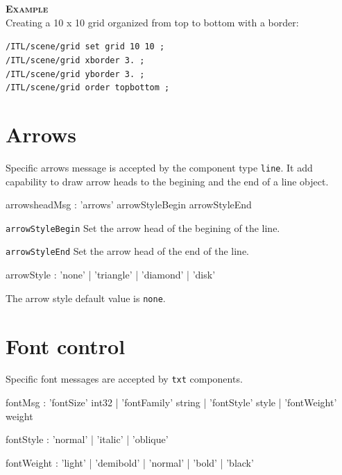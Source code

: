 \documentclass[a4paper,twoside]{report}
\newcommand{\sublevel}[1]	{\section{#1}}
\newcommand{\OSC}[1]		{\texttt{#1}}
\newcommand{\example}		{\textbf{\hspace{-1.5cm}\textbf{\textsc{Example }}}}
\let\olditemize\itemize
\let\oldenditemize\enditemize
\renewenvironment{itemize} 	{\olditemize \setlength{\itemsep}{1mm}}{\oldenditemize}
\newcommand{\sample}	[1]			{\vspace{-2mm}\begin{center}\colorbox{mygrey}{
								\begin{minipage}[t]{0.9\columnwidth} 
								{\small \texttt{#1}}
								\end{minipage}}\end{center}}
\begin{document}
\example \\
Creating a 10 x 10 grid organized from top to bottom with a border:
\sample{/ITL/scene/grid set grid 10 10 ;\\
/ITL/scene/grid xborder 3. ;\\
/ITL/scene/grid yborder 3. ;\\
/ITL/scene/grid order topbottom ;
}


\sublevel{Arrows}
\label{arrows}

Specific arrows message is accepted by the component type \OSC{line}. It add capability to draw arrow heads to the begining and the end of a line object.
\begin{rail}
arrowsheadMsg : 'arrows' arrowStyleBegin arrowStyleEnd 
\end{rail}

\begin{itemize}
\item \OSC{arrowStyleBegin} Set the arrow head of the begining of the line.
\item \OSC{arrowStyleEnd} Set the arrow head of the end of the line.
\end{itemize}
\begin{rail}
arrowStyle : 'none' | 'triangle' | 'diamond' | 'disk'
\end{rail}
The arrow style default value is \OSC{none}.

\sublevel{Font control}
\label{fontctrl}
Specific font messages are accepted by \OSC{txt} components.
\begin{rail}
fontMsg : 	  'fontSize' int32 
			| 'fontFamily' string
			| 'fontStyle' style
			| 'fontWeight' weight
\end{rail}

\begin{rail}
	fontStyle : 'normal' | 'italic' | 'oblique'
\end{rail}

\begin{rail}
	fontWeight : 'light' | 'demibold' | 'normal' | 'bold' | 'black'
\end{rail}
\end{document}
